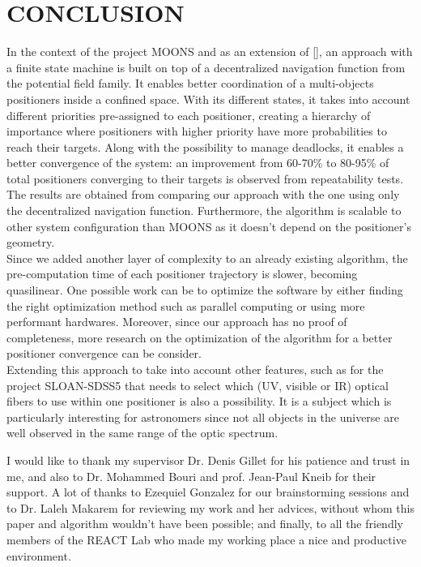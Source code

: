 \documentclass[]{spie}  %
\begin{document}
	
	\section{CONCLUSION}
	\label{CONCLUSION}
	In the context of the project MOONS and as an extension of [], an approach with a finite state machine is built on top of a decentralized navigation function from the potential field family. It enables better coordination of a multi-objects positioners inside a confined space. With its different states, it takes into account different priorities pre-assigned to each positioner, creating a hierarchy of importance where positioners with higher priority have more probabilities to reach their targets. Along with the possibility to manage deadlocks, it enables a better convergence of the system:
	 an improvement from  60-70\% to 80-95\% of total positioners converging to their targets is observed from repeatability tests. The results are obtained from comparing our approach with the one using only the decentralized navigation function. Furthermore, the algorithm is scalable to other system configuration than MOONS as it doesn't depend on the positioner's geometry.\\
	Since we added another layer of complexity to an already existing algorithm, the pre-computation time of each positioner trajectory is slower, becoming quasilinear. One possible work can be to optimize the software by either finding the right optimization method such as parallel computing or using more performant hardwares. Moreover, since our approach has no proof of completeness, more research on the optimization of the algorithm for a better positioner convergence can be consider.\\
	Extending this approach to take into account other features, such as for the project SLOAN-SDSS5 that needs to select which (UV, visible or IR) optical fibers to use within one positioner is also a possibility. It is a subject which is particularly interesting for astronomers since not all objects in the universe are well observed in the same range of the optic spectrum.
	
	\acknowledgments %
	
	I would like to thank my supervisor Dr. Denis Gillet for his patience and trust in me, and also to Dr. Mohammed Bouri and prof. Jean-Paul Kneib for their support. A lot of thanks to Ezequiel Gonzalez for our brainstorming sessions and to Dr. Laleh Makarem for reviewing my work and her advices, without whom this paper and algorithm wouldn't have been possible; and finally, to all the friendly members of the REACT Lab who made my working place a nice and productive environment. 
	

\end{document}
